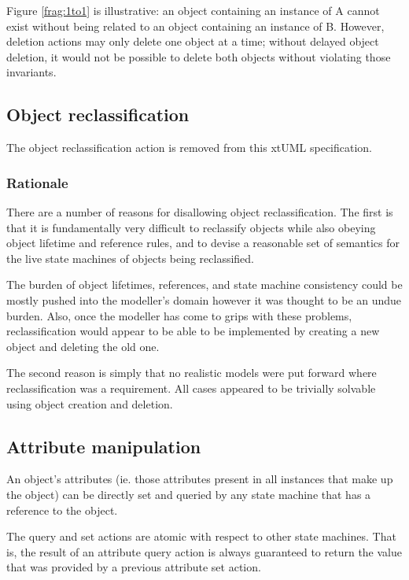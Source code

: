 
Figure \ref{frag:1to1} is illustrative: an object containing an instance of A
cannot exist without being related to an object containing an instance of B.
However, deletion actions may only delete one object at a time; without delayed
object deletion, it would not be possible to delete both objects without
violating those invariants.

\subsection{Object reclassification}
The object reclassification action is removed from this xtUML specification.

\subsubsection{Rationale}
There are a number of reasons for disallowing object reclassification. The
first is that it is fundamentally very difficult to reclassify objects while
also obeying object lifetime and reference rules, and to devise a reasonable
set of semantics for the live state machines of objects being reclassified.

The burden of object lifetimes, references, and state machine consistency could
be mostly pushed into the modeller's domain however it was thought to be an
undue burden. Also, once the modeller has come to grips with these problems,
reclassification would appear to be able to be implemented by creating a new
object and deleting the old one.

The second reason is simply that no realistic models were put forward where
reclassification was a requirement. All cases appeared to be trivially
solvable using object creation and deletion.

\subsection{Attribute manipulation}
\label{sec:attributeManipulation}
An object's attributes (ie. those attributes present in all instances
that make up the object) can be directly set and queried by any state
machine that has a reference to the object.

The query and set actions are atomic with respect to other state machines.
That is, the result of an attribute query action is always guaranteed to
return the value that was provided by a previous attribute set action.

